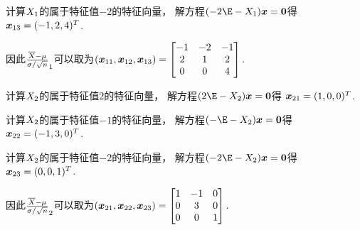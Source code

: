 \begin{example}
\begin{solution}
计算\(X_1\)的属于特征值\(-2\)的特征向量，
解方程\((-2\E-\A) \vb{x} = \vb0\)得
\(\boldsymbol{x}_{13} = (-1,2,4)^T\).

因此\(\P_1\)可以取为\begin{math}
	(\boldsymbol{x}_{11},\boldsymbol{x}_{12},\boldsymbol{x}_{13})
	= \begin{bmatrix}
		-1 & -2 & -1 \\
		2 & 1 & 2 \\
		0 & 0 & 4
	\end{bmatrix}.
\end{math}

计算\(X_2\)的属于特征值\(2\)的特征向量，
解方程\((2\E-\B) \vb{x} = \vb0\)得
\(\boldsymbol{x}_{21} = (1,0,0)^T\).

计算\(X_2\)的属于特征值\(-1\)的特征向量，
解方程\((-\E-\B) \vb{x} = \vb0\)得
\(\boldsymbol{x}_{22} = (-1,3,0)^T\).

计算\(X_2\)的属于特征值\(-2\)的特征向量，
解方程\((-2\E-\B) \vb{x} = \vb0\)得
\(\boldsymbol{x}_{23} = (0,0,1)^T\).

因此\(\P_2\)可以取为\begin{math}
	(\boldsymbol{x}_{21},\boldsymbol{x}_{22},\boldsymbol{x}_{23})
	= \begin{bmatrix}
		1 & -1 & 0 \\
		0 & 3 & 0 \\
		0 & 0 & 1
	\end{bmatrix}.
\end{math}


\end{solution}
\end{example}
